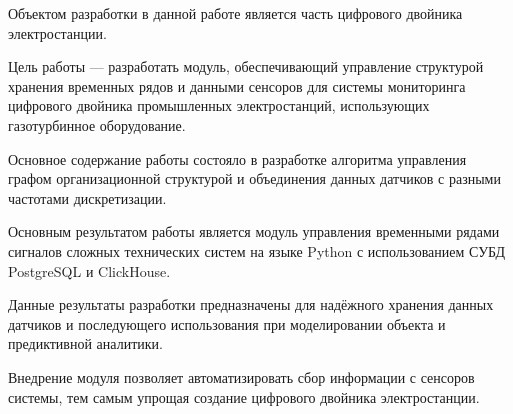 \abstract %


Объектом разработки в данной работе является часть цифрового двойника электростанции.

Цель работы --- разработать модуль, обеспечивающий управление структурой хранения временных рядов и данными сенсоров для системы мониторинга цифрового двойника промышленных электростанций, использующих газотурбинное оборудование.

Основное содержание работы состояло в разработке алгоритма управления графом организационной структурой и объединения данных датчиков с разными частотами дискретизации.

Основным результатом работы является модуль управления временными рядами сигналов сложных технических систем на языке Python с использованием СУБД PostgreSQL и ClickHouse.

Данные результаты разработки предназначены для надёжного хранения данных датчиков и последующего использования при моделировании объекта и предиктивной аналитики.

Внедрение модуля позволяет автоматизировать сбор информации с сенсоров системы, тем самым упрощая создание цифрового двойника электростанции.
